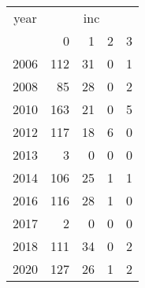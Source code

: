 \footnotesize\begin{tabular}[t]{lrrrr}
\toprule
\multicolumn{1}{c}{year} & \multicolumn{4}{c}{inc} \\
\cmidrule(l{3pt}r{3pt}){1-1} \cmidrule(l{3pt}r{3pt}){2-5}
  & 0 & 1 & 2 & 3\\
\midrule
2006 & 112 & 31 & 0 & 1\\
2008 & 85 & 28 & 0 & 2\\
2010 & 163 & 21 & 0 & 5\\
2012 & 117 & 18 & 6 & 0\\
2013 & 3 & 0 & 0 & 0\\
2014 & 106 & 25 & 1 & 1\\
2016 & 116 & 28 & 1 & 0\\
2017 & 2 & 0 & 0 & 0\\
2018 & 111 & 34 & 0 & 2\\
2020 & 127 & 26 & 1 & 2\\
\bottomrule
\end{tabular}
